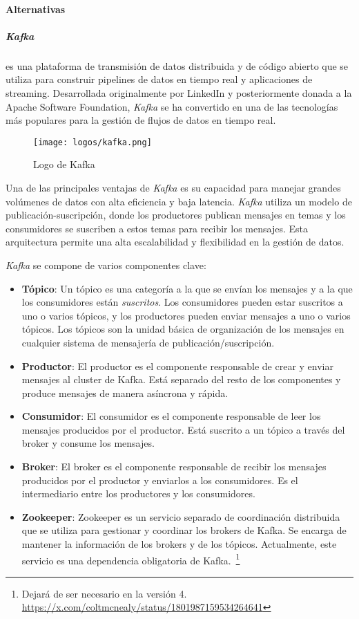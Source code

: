 \paragraph{Alternativas}
\subparagraph{Kafka} es una plataforma de transmisión de datos distribuida y de
código abierto que se utiliza para construir pipelines de datos en tiempo real y
aplicaciones de streaming. Desarrollada originalmente por LinkedIn y
posteriormente donada a la Apache Software Foundation, \textit{Kafka} se ha
convertido en una de las tecnologías más populares para la gestión de flujos de
datos en tiempo real.

\begin{figure}[H]
	\centering
	\texttt{[image: logos/kafka.png]}
	\caption{Logo de Kafka~\textregistered}
	\label{fig:kafka}
\end{figure}

Una de las principales ventajas de \textit{Kafka} es su capacidad para manejar
grandes volúmenes de datos con alta eficiencia y baja latencia. \textit{Kafka}
utiliza un modelo de publicación-suscripción, donde los productores publican
mensajes en temas y los consumidores se suscriben a estos temas para recibir
los mensajes. Esta arquitectura permite una alta escalabilidad y flexibilidad
en la gestión de datos.

\textit{Kafka} se compone de varios componentes clave:

\begin{itemize}
    \item \textbf{Tópico}: Un tópico es una categoría a la que se envían los
		mensajes y a la que los consumidores están \textit{suscritos}. Los
		consumidores pueden estar suscritos a uno o varios tópicos, y los
		productores pueden enviar mensajes a uno o varios tópicos. Los tópicos
		son la unidad básica de organización de los mensajes en cualquier
		sistema de mensajería de publicación/suscripción.
    \item \textbf{Productor}: El productor es el componente responsable de crear
		y enviar mensajes al cluster de Kafka. Está separado del resto de los
		componentes y produce mensajes de manera asíncrona y rápida.
    \item \textbf{Consumidor}: El consumidor es el componente responsable de
		leer los mensajes producidos por el productor. Está suscrito a un tópico
		a través del broker y consume los mensajes.
    \item \textbf{Broker}: El broker es el componente responsable de recibir los
		mensajes producidos por el productor y enviarlos a los consumidores. Es
		el intermediario entre los productores y los consumidores.
    \item \textbf{Zookeeper}: Zookeeper es un servicio separado de coordinación
		distribuida que se utiliza para gestionar y coordinar los brokers de
		Kafka. Se encarga de mantener la información de los brokers y de los
		tópicos. Actualmente, este servicio es una dependencia obligatoria de
		Kafka.~\footnote{
			Dejará de ser necesario en la versión 4.
			\url{https://x.com/coltmcnealy/status/1801987159534264641}
		}
\end{itemize}

